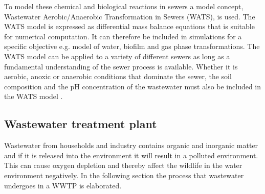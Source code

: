 
To model these chemical and biological reactions in sewers a model concept, Wastewater Aerobic/Anaerobic Transformation in Sewers (WATS), is used. The WATS model is expressed as differential mass balance equations that is suitable for numerical computation. It can therefore be included in simulations for a specific objective e.g. model of water, biofilm and gas phase transformations. The WATS model can be applied to a variety of different sewers as long as a fundamental understanding of the sewer process is available. Whether it is aerobic, anoxic or anaerobic conditions that dominate the sewer, the soil composition and the pH concentration of the wastewater must also be included in the WATS model \cite{Sewer_processes}.     





\subsection{Wastewater treatment plant}\label{subse:Wastewater treatment plant}
Wastewater from households and industry contains organic and inorganic matter and if it is released into the environment it will result in a polluted environment. This can cause oxygen depletion and thereby affect the wildlife in the water environment negatively. %
In the following section the process that wastewater undergoes in a WWTP is elaborated. 

